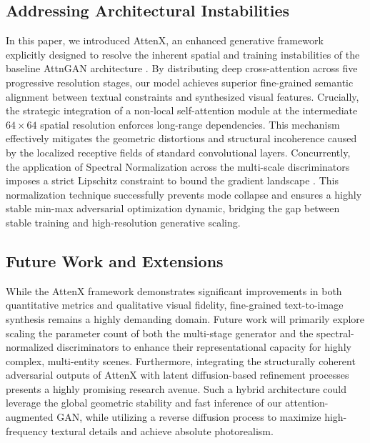 \documentclass[conference]{IEEEtran}
\begin{document}
\subsection{Addressing Architectural Instabilities}
In this paper, we introduced AttenX, an enhanced generative framework explicitly designed to resolve the inherent spatial and training instabilities of the baseline AttnGAN architecture \cite{xu2018attngan}. By distributing deep cross-attention across five progressive resolution stages, our model achieves superior fine-grained semantic alignment between textual constraints and synthesized visual features. Crucially, the strategic integration of a non-local self-attention module \cite{wang2018nonlocal, zhang2019selfattention} at the intermediate $64 \times 64$ spatial resolution enforces long-range dependencies. This mechanism effectively mitigates the geometric distortions and structural incoherence caused by the localized receptive fields of standard convolutional layers. Concurrently, the application of Spectral Normalization \cite{miyato2018spectral} across the multi-scale discriminators imposes a strict Lipschitz constraint to bound the gradient landscape \cite{arjovsky2017wasserstein}. This normalization technique successfully prevents mode collapse and ensures a highly stable min-max adversarial optimization dynamic, bridging the gap between stable training and high-resolution generative scaling.

\subsection{Future Work and Extensions}
While the AttenX framework demonstrates significant improvements in both quantitative metrics and qualitative visual fidelity, fine-grained text-to-image synthesis remains a highly demanding domain. Future work will primarily explore scaling the parameter count of both the multi-stage generator and the spectral-normalized discriminators to enhance their representational capacity for highly complex, multi-entity scenes. Furthermore, integrating the structurally coherent adversarial outputs of AttenX with latent diffusion-based refinement processes \cite{ho2020denoising, dhariwal2021diffusion} presents a highly promising research avenue. Such a hybrid architecture could leverage the global geometric stability and fast inference of our attention-augmented GAN, while utilizing a reverse diffusion process to maximize high-frequency textural details and achieve absolute photorealism.
\end{document}
